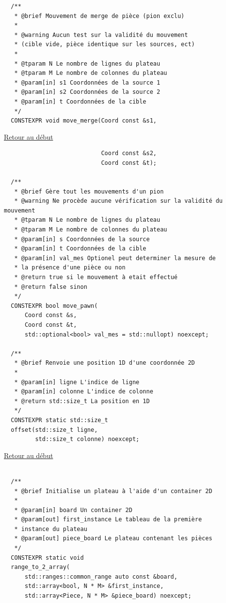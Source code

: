 {\begin{frame}[fragile]
\begin{verbatim}
  /**
   * @brief Mouvement de merge de pièce (pion exclu)
   *
   * @warning Aucun test sur la validité du mouvement
   * (cible vide, pièce identique sur les sources, ect)
   *
   * @tparam N Le nombre de lignes du plateau
   * @tparam M Le nombre de colonnes du plateau
   * @param[in] s1 Coordonnées de la source 1
   * @param[in] s2 Coordonnées de la source 2
   * @param[in] t Coordonnées de la cible
   */
  CONSTEXPR void move_merge(Coord const &s1,
\end{verbatim}
\end{frame}

\begin{frame}[fragile]
\hyperlink{conclusion}{Retour au début}\newline
\begin{verbatim}
                            Coord const &s2,
                            Coord const &t);

  /**
   * @brief Gère tout les mouvements d'un pion
   * @warning Ne procède aucune vérification sur la validité du mouvement
   * @tparam N Le nombre de lignes du plateau
   * @tparam M Le nombre de colonnes du plateau
   * @param[in] s Coordonnées de la source
   * @param[in] t Coordonnées de la cible
   * @param[in] val_mes Optionel peut determiner la mesure de
   * la présence d'une pièce ou non
   * @return true si le mouvement à etait effectué
   * @return false sinon
   */
  CONSTEXPR bool move_pawn(
      Coord const &s,
      Coord const &t,
      std::optional<bool> val_mes = std::nullopt) noexcept;

  /**
   * @brief Renvoie une position 1D d'une coordonnée 2D
   *
   * @param[in] ligne L'indice de ligne
   * @param[in] colonne L'indice de colonne
   * @return std::size_t La position en 1D
   */
  CONSTEXPR static std::size_t
  offset(std::size_t ligne,
         std::size_t colonne) noexcept;
\end{verbatim}
\end{frame}

\begin{frame}[fragile]
\hyperlink{conclusion}{Retour au début}\newline
\begin{verbatim}

  /**
   * @brief Initialise un plateau à l'aide d'un container 2D
   *
   * @param[in] board Un container 2D
   * @param[out] first_instance Le tableau de la première
   * instance du plateau
   * @param[out] piece_board Le plateau contenant les pièces
   */
  CONSTEXPR static void
  range_to_2_array(
      std::ranges::common_range auto const &board,
      std::array<bool, N * M> &first_instance,
      std::array<Piece, N * M> &piece_board) noexcept;


\end{verbatim}
\end{frame}}
